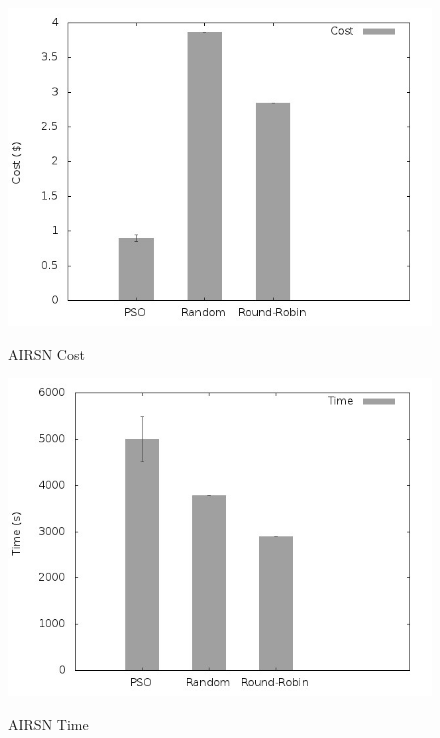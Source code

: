 \documentclass[a4paper,10pt]{article}
\begin{document}
\begin{figure}[!htb]

\centering

\includegraphics[scale=.55]{graphs/airns_cost.jpeg}
\label{airsn_cost}
\caption{AIRSN Cost}

\includegraphics[scale=.55]{graphs/airns_time.jpeg}
\label{airsn_time}
\caption{AIRSN Time}

\end{figure}
\end{document}
